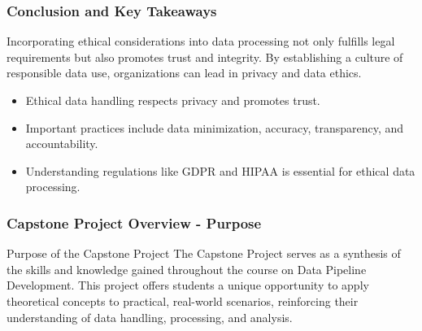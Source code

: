 \documentclass{beamer}
\begin{document}
\begin{frame}[fragile]
    \frametitle{Conclusion and Key Takeaways}
    Incorporating ethical considerations into data processing not only fulfills legal requirements but also promotes trust and integrity. By establishing a culture of responsible data use, organizations can lead in privacy and data ethics.

    \begin{itemize}
        \item Ethical data handling respects privacy and promotes trust.
        \item Important practices include data minimization, accuracy, transparency, and accountability.
        \item Understanding regulations like GDPR and HIPAA is essential for ethical data processing.
    \end{itemize}
\end{frame}

\begin{frame}[fragile]
    \frametitle{Capstone Project Overview - Purpose}
    \begin{block}{Purpose of the Capstone Project}
        The Capstone Project serves as a synthesis of the skills and knowledge gained throughout the course on Data Pipeline Development. 
        This project offers students a unique opportunity to apply theoretical concepts to practical, real-world scenarios, reinforcing their understanding of data handling, processing, and analysis.
    \end{block}
\end{frame}
\end{document}
